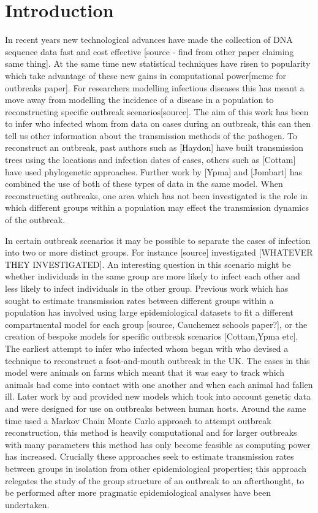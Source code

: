 \documentclass[11pt,a4paper]{report}
\begin{document}
\chapter{Introduction}
In recent years new technological advances have made the collection of DNA sequence data fast and cost effective [source - find from other paper claiming same thing]. At the same time new statistical techniques have risen to popularity which take advantage of these new gains in computational power[mcmc for outbreaks paper]. For researchers modelling infectious diseases this has meant a move away from modelling the incidence of a disease in a population to reconstructing specific outbreak scenarios[source]. The aim of this work has been to infer who infected whom from data on cases during an outbreak, this can then tell us other information about the transmission methods of the pathogen. To reconstruct an outbreak, past authors such as [Haydon] have built transmission trees using the locations and infection dates of cases, others such as [Cottam] have used phylogenetic approaches. Further work by [Ypma] and [Jombart] has combined the use of both of these types of data in the same model. When reconstructing outbreaks, one area which has not been investigated is the role in which different groups within a population may effect the transmission dynamics of the outbreak.

In certain outbreak scenarios it may be possible to separate the cases of infection into two or more distinct groups. For instance [source] investigated [WHATEVER THEY INVESTIGATED]. An interesting question in this scenario might be whether individuals in the same group are more likely to infect each other and less likely to infect individuals in the other group. Previous work which has sought to estimate transmission rates between different groups within a population has involved using large epidemiological datasets to fit a different compartmental model for each group [source, Cauchemez schools paper?], or the creation of bespoke models for specific outbreak scenarios [Cottam,Ypma etc]. The earliest attempt to infer who infected whom began with \citet{Haydon03} who devised a technique to reconstruct a foot-and-mouth outbreak in the UK. The cases in this model were animals on farms which meant that it was easy to track which animals had come into contact with one another and when each animal had fallen ill. Later work by \citet{Cottam08} and \citet{Ypma13} provided new models which took into account genetic data and were designed for use on outbreaks between human hosts. Around the same time \citet{Morelli12} used a Markov Chain Monte Carlo approach to attempt outbreak reconstruction, this method is heavily computational and for larger outbreaks with many parameters this method has only become feasible as computing power has increased. Crucially these approaches seek to estimate transmission rates between groups in isolation from other epidemiological properties; this approach relegates the study of the group structure of an outbreak to an afterthought, to be performed after more pragmatic epidemiological analyses have been undertaken.
\end{document}
